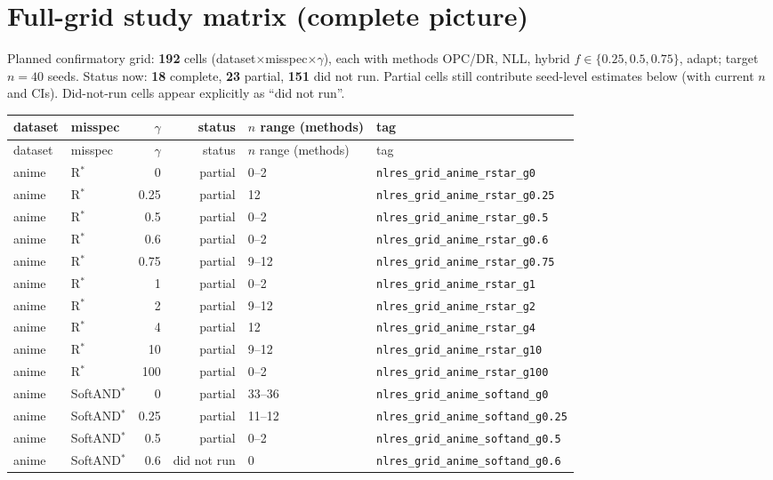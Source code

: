 \documentclass[10pt,a4paper]{article}
\begin{document}
\section{Full-grid study matrix (complete picture)}
Planned confirmatory grid: \textbf{192} cells (dataset$\times$misspec$\times\gamma$), each with methods OPC/DR, NLL, hybrid $f\in\{0.25,0.5,0.75\}$, adapt; target $n{=}40$ seeds. Status now: \textbf{18} complete, \textbf{23} partial, \textbf{151} did not run. Partial cells still contribute seed-level estimates below (with current $n$ and CIs). Did-not-run cells appear explicitly as ``did not run''.
{\footnotesize\begin{longtable}{llrrll}
\toprule dataset & misspec & $\gamma$ & status & $n$ range (methods) & tag \\
\midrule\endfirsthead
\toprule dataset & misspec & $\gamma$ & status & $n$ range (methods) & tag \\
\midrule\endhead\bottomrule\endfoot
anime & R$^*$ & 0 & partial & 0--2 & \texttt{nlres\_grid\_anime\_rstar\_g0} \\
anime & R$^*$ & 0.25 & partial & 12 & \texttt{nlres\_grid\_anime\_rstar\_g0.25} \\
anime & R$^*$ & 0.5 & partial & 0--2 & \texttt{nlres\_grid\_anime\_rstar\_g0.5} \\
anime & R$^*$ & 0.6 & partial & 0--2 & \texttt{nlres\_grid\_anime\_rstar\_g0.6} \\
anime & R$^*$ & 0.75 & partial & 9--12 & \texttt{nlres\_grid\_anime\_rstar\_g0.75} \\
anime & R$^*$ & 1 & partial & 0--2 & \texttt{nlres\_grid\_anime\_rstar\_g1} \\
anime & R$^*$ & 2 & partial & 9--12 & \texttt{nlres\_grid\_anime\_rstar\_g2} \\
anime & R$^*$ & 4 & partial & 12 & \texttt{nlres\_grid\_anime\_rstar\_g4} \\
anime & R$^*$ & 10 & partial & 9--12 & \texttt{nlres\_grid\_anime\_rstar\_g10} \\
anime & R$^*$ & 100 & partial & 0--2 & \texttt{nlres\_grid\_anime\_rstar\_g100} \\
anime & SoftAND$^*$ & 0 & partial & 33--36 & \texttt{nlres\_grid\_anime\_softand\_g0} \\
anime & SoftAND$^*$ & 0.25 & partial & 11--12 & \texttt{nlres\_grid\_anime\_softand\_g0.25} \\
anime & SoftAND$^*$ & 0.5 & partial & 0--2 & \texttt{nlres\_grid\_anime\_softand\_g0.5} \\
anime & SoftAND$^*$ & 0.6 & did not run & 0 & \texttt{nlres\_grid\_anime\_softand\_g0.6} \\

\end{longtable}}
\end{document}
